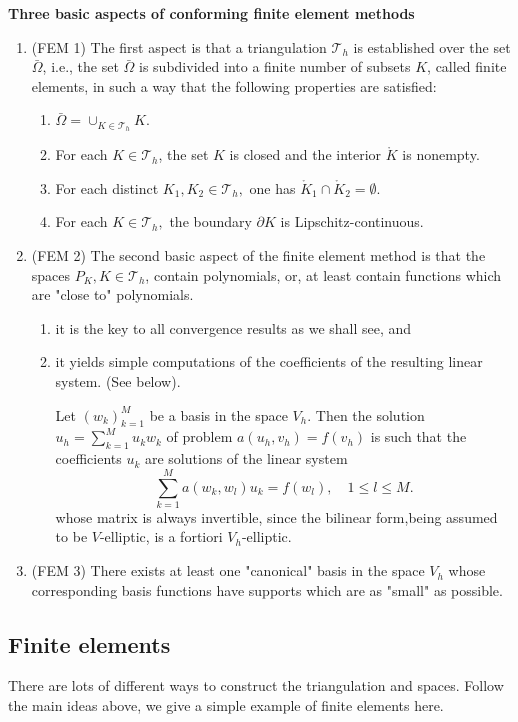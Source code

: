 \documentclass[11pt,letterpaper]{article}
\begin{document}
\textbf{Three basic aspects of conforming finite element methods}
\begin{enumerate}
\item (FEM 1) The first aspect is that a triangulation $\mathscr{T}_h$ is established over
  the set $\bar \Omega$, i.e., the set $\bar \Omega$ is subdivided into a finite number of subsets $K$,
  called finite elements, in such a way that the following properties are satisfied:
  \begin{enumerate}
  \item $\bar \Omega = \cup_{K\in \mathscr{T}_h}K.$
  \item For each $K\in \mathscr{T}_h$, the set $K$ is closed and the interior $\mathring{K}$ is nonempty.
  \item For each distinct $K_1,K_2\in \mathscr{T}_h,$ one has $\mathring{K}_1\cap \mathring{K}_2=\emptyset.$
  \item For each $K\in \mathscr{T}_h,$
    the boundary $\partial K$ is Lipschitz-continuous.
  \end{enumerate}
\item (FEM 2)
  The second basic aspect of the finite element method is that the spaces $P_K, K\in \mathscr{T}_h$,
  contain polynomials, or, at least contain functions which are "close to" polynomials.
  \begin{enumerate}
  \item it is the key to all convergence results as we shall see, and 
  \item it yields simple computations of the coefficients of the resulting linear system.
    (See below).

    Let $(w_k)_{k=1}^M$ be a basis in the space $V_h$.
    Then the solution $u_h=\sum_{k=1}^Mu_kw_k$ of problem $a(u_h,v_h)=f(v_h)$
    is such that the coefficients $u_k$
    are solutions of the linear system
    \begin{equation}
      \sum_{k=1}^Ma(w_k,w_l)u_k= f(w_l), \quad 1\leq l \leq M.
    \end{equation}
    whose matrix is always invertible,
    since the bilinear form,being assumed to be $V$-elliptic, is a fortiori $V_h$-elliptic.
  \end{enumerate}
\item (FEM 3) There exists at least one
  "canonical" basis in the space $V_h$ whose corresponding basis functions
  have supports which are as "small" as possible.
\end{enumerate}


\subsection{Finite elements}
\label{sec:finite-ele}
There are lots of different ways to construct the triangulation and spaces.
Follow the main ideas above, we give a simple example of finite elements here.
\end{document}
